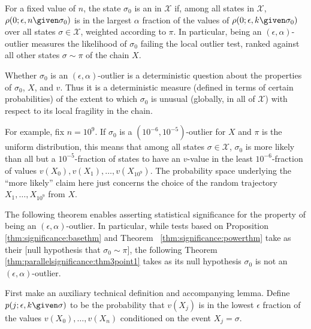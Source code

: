 \documentclass[12pt]{article}
\begin{document}
\begin{definition}
    For a fixed value of \( n \), the state \( \sigma_0 \) is an  in \( \mathcal{X} \) if, among all
    states in \( \mathcal{X} \), \( \rho(0; \epsilon, n \given \sigma_{0})
    \) is in the largest \( \alpha \) fraction of the values of \( \rho(0;
    \epsilon, k \given \sigma_{0}) \) over all states \( \sigma \in
    \mathcal{X} \), weighted according to \( \pi \).  In particular,
    being an \( (\epsilon, \alpha) \)-outlier measures the likelihood of
    \( \sigma_0 \) failing the local outlier test, ranked against all
    other states \( \sigma \sim \pi \) of the chain \( X \).
\end{definition}

Whether \( \sigma_0 \) is an \( (\epsilon, \alpha) \)-outlier is a
deterministic question about the properties of \( \sigma_0 \), \( X \),
and \( v \).  Thus it is a deterministic measure (defined in terms of
certain probabilities) of the extent to which \( \sigma_0 \) is unusual
(globally, in all of \( \mathcal{X} \)) with respect to its local
fragility in the chain.

\begin{example}
    For example, fix \( n = 10^9 \).  If \( \sigma_0 \) is a \( (10^{-6},
    10^{-5}) \)-outlier for \( X \) and \( \pi \) is the uniform
    distribution, this means that among all states \( \sigma \in
    \mathcal{X} \), \( \sigma_0 \) is more likely than all but a \( 10^{-5}
    \)-fraction of states to have an \( v \)-value in the least \( 10^{-6}
    \)-fraction of values \( v(X_0), v(X_1 ), \dots , v(X_{10^9} ) \).
    The probability space underlying the ``more likely'' claim here just
    concerns the choice of the random trajectory \( X_1, \dots, X_{10^9}
    \) from \( X \).
\end{example}

The following theorem enables asserting statistical significance for the
property of being an \( (\epsilon, \alpha) \)-outlier.  In particular,
while tests based on Proposition~%
\ref{thm:significance:basethm} and Theorem~%
\ref{thm:significance:powerthm} take as their [null hypothesis that \(
\sigma_0 \sim \pi \)], the following Theorem~%
\ref{thm:parallelsignificance:thm3point1} takes as its null hypothesis \(
\sigma_{0} \) is not an \( (\epsilon, \alpha) \)-outlier.

First make an auxiliary technical definition and accompanying lemma.
Define \( p(j; \epsilon,k \given \sigma) \) to be the probability that \(
v(X_j) \) is in the lowest \( \epsilon \) fraction of the values \( v(X_0),
\dots, v(X_n) \) conditioned on the event \( X_j = \sigma \).
\end{document}
